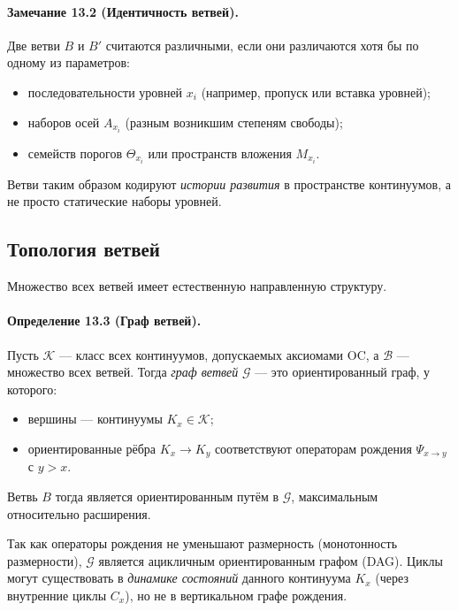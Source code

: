 \paragraph{Замечание 13.2 (Идентичность ветвей).}
Две ветви \(B\) и \(B'\) считаются различными, если они различаются хотя бы
по одному из параметров:
\begin{itemize}
  \item последовательности уровней \(x_i\) (например, пропуск или вставка
        уровней);
  \item наборов осей \(A_{x_i}\) (разным возникшим степеням свободы);
  \item семейств порогов \(\Theta_{x_i}\) или пространств вложения \(M_{x_i}\).
\end{itemize}
Ветви таким образом кодируют \emph{истории развития} в пространстве
континуумов, а не просто статические наборы уровней.

\subsection{Топология ветвей}

Множество всех ветвей имеет естественную направленную структуру.

\paragraph{Определение 13.3 (Граф ветвей).}
Пусть \(\mathcal{K}\) — класс всех континуумов, допускаемых аксиомами OC, а
\(\mathcal{B}\) — множество всех ветвей. Тогда
\emph{граф ветвей} \(\mathcal{G}\) — это ориентированный граф, у которого:
\begin{itemize}
  \item вершины — континуумы \(K_x\in\mathcal{K}\);
  \item ориентированные рёбра \(K_x \to K_y\) соответствуют операторам
        рождения \(\Psi_{x\to y}\) с \(y > x\).
\end{itemize}
Ветвь \(B\) тогда является ориентированным путём в \(\mathcal{G}\),
максимальным относительно расширения.

Так как операторы рождения не уменьшают размерность (монотонность размерности),
\(\mathcal{G}\) является ацикличным ориентированным графом (DAG). Циклы
могут существовать в \emph{динамике состояний} данного континуума \(K_x\)
(через внутренние циклы \(C_x\)), но не в вертикальном графе рождения.

